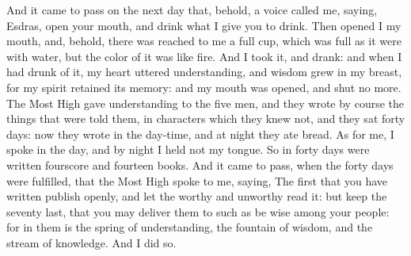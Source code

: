 {And it came to pass on the next day that, behold, a voice called me, saying, Esdras, open your mouth, and drink what I give you to drink.
Then opened I my mouth, and, behold, there was reached to me a full cup, which was full as it were with water, but the color of it was like fire.
And I took it, and drank: and when I had drunk of it, my heart uttered understanding, and wisdom grew in my breast, for my spirit retained its memory:
and my mouth was opened, and shut no more.
The Most High gave understanding to the five men, and they wrote by course the things that were told them, in
 characters which they knew not, and they sat forty days: now they wrote in the day-time, and at night they ate bread.
As for me, I spoke in the day, and by night I held not my tongue.
So in forty days were written
 fourscore and fourteen books.
And it came to pass, when the forty days were fulfilled, that the Most High spoke to me, saying, The first that you have written publish openly, and let the worthy and unworthy read it:
but keep the seventy last, that you may deliver them to such as be wise among your people:
for in them is the spring of understanding, the fountain of wisdom, and the stream of knowledge.
And I did so.

}

